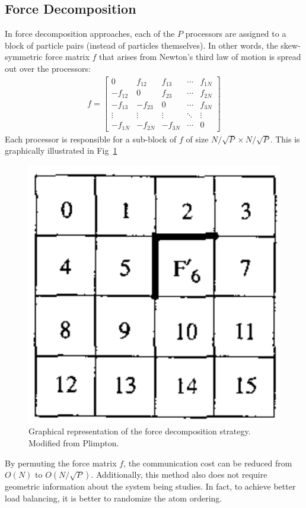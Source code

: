\documentclass[conference]{IEEEtran}
\begin{document}
    \subsection{Force Decomposition}
    In force decomposition approaches, each of the $P$ processors are assigned to a block of particle pairs (instead
    of particles themselves). In other words, the skew-symmetric force matrix $f$ that arises from Newton's third
    law of motion is spread out over the processors:
    \begin{align*}
        f =
        \begin{bmatrix}
        0 & f_{12} & f_{13} & \cdots & f_{1N} \\
        -f_{12} & 0 & f_{23} & \cdots & f_{2N} \\
        -f_{13} & -f_{23} & 0 & \cdots & f_{3N} \\
        \vdots & \vdots & \vdots & \ddots & \vdots \\
        -f_{1N} & -f_{2N} & -f_{3N} & \cdots & 0
        \end{bmatrix}  
    \end{align*}
    Each processor is responsible for a sub-block of $f$ of size $N/\sqrt{P} \times N/\sqrt{P}$. This is graphically
    illustrated in Fig~\ref{fig:force-decomp}
    \begin{figure}[H]
        \centering
        \includegraphics[width=0.35\linewidth]{images/force-decomp-graphic.png}
        \caption{Graphical representation of the force decomposition strategy. Modified 
        from Plimpton.~\cite{plimpton1995fast}}\label{fig:force-decomp}
    \end{figure}
    By permuting the force matrix $f$, the communication cost can be reduced from $O(N)$ to $O(N/\sqrt{P})$.
    Additionally, this method also does not require geometric information about the system being studies. In fact,
    to achieve better load balancing, it is better to randomize the atom ordering.~\cite{plimpton1995fast}
\end{document}
